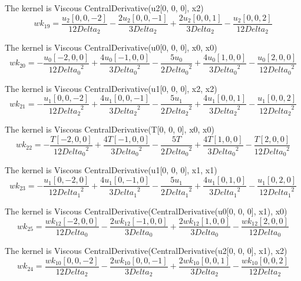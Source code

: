 \documentclass{article}
\begin{document}
The kernel is Viscous CentralDerivative(u2[0, 0, 0], x2) \begin{dmath}{wk_{19}} = \frac{{u_{2}}[{0,0,-2}]}{12 Delta_2} - 
\frac{2 {u_{2}}[{0,0,-1}]}{3 Delta_2} + \frac{2 {u_{2}}[{0,0,1}]}{3 
Delta_2} - \frac{{u_{2}}[{0,0,2}]}{12 Delta_2}\end{dmath}

The kernel is Viscous CentralDerivative(u0[0, 0, 0], x0, x0) \begin{dmath}{wk_{20}} = - \frac{{u_{0}}[{-2,0,0}]}{12 {Delta_0}^{2}} 
+ \frac{4 {u_{0}}[{-1,0,0}]}{3 {Delta_0}^{2}} - \frac{5 {u_{0}}}{2 
{Delta_0}^{2}} + \frac{4 {u_{0}}[{1,0,0}]}{3 {Delta_0}^{2}} - 
\frac{{u_{0}}[{2,0,0}]}{12 {Delta_0}^{2}}\end{dmath}

The kernel is Viscous CentralDerivative(u1[0, 0, 0], x2, x2) \begin{dmath}{wk_{21}} = - \frac{{u_{1}}[{0,0,-2}]}{12 {Delta_2}^{2}} 
+ \frac{4 {u_{1}}[{0,0,-1}]}{3 {Delta_2}^{2}} - \frac{5 {u_{1}}}{2 
{Delta_2}^{2}} + \frac{4 {u_{1}}[{0,0,1}]}{3 {Delta_2}^{2}} - 
\frac{{u_{1}}[{0,0,2}]}{12 {Delta_2}^{2}}\end{dmath}

The kernel is Viscous CentralDerivative(T[0, 0, 0], x0, x0) \begin{dmath}{wk_{22}} = - \frac{{T}[{-2,0,0}]}{12 {Delta_0}^{2}} + 
\frac{4 {T}[{-1,0,0}]}{3 {Delta_0}^{2}} - \frac{5 {T}}{2 
{Delta_0}^{2}} + \frac{4 {T}[{1,0,0}]}{3 {Delta_0}^{2}} - 
\frac{{T}[{2,0,0}]}{12 {Delta_0}^{2}}\end{dmath}

The kernel is Viscous CentralDerivative(u1[0, 0, 0], x1, x1) \begin{dmath}{wk_{23}} = - \frac{{u_{1}}[{0,-2,0}]}{12 {Delta_1}^{2}} 
+ \frac{4 {u_{1}}[{0,-1,0}]}{3 {Delta_1}^{2}} - \frac{5 {u_{1}}}{2 
{Delta_1}^{2}} + \frac{4 {u_{1}}[{0,1,0}]}{3 {Delta_1}^{2}} - 
\frac{{u_{1}}[{0,2,0}]}{12 {Delta_1}^{2}}\end{dmath}

The kernel is Viscous CentralDerivative(CentralDerivative(u0[0, 0, 0], x1), x0) \begin{dmath}{wk_{25}} = \frac{{wk_{12}}[{-2,0,0}]}{12 Delta_0} - 
\frac{2 {wk_{12}}[{-1,0,0}]}{3 Delta_0} + \frac{2 
{wk_{12}}[{1,0,0}]}{3 Delta_0} - \frac{{wk_{12}}[{2,0,0}]}{12 
Delta_0}\end{dmath}

The kernel is Viscous CentralDerivative(CentralDerivative(u2[0, 0, 0], x1), x2) \begin{dmath}{wk_{24}} = \frac{{wk_{10}}[{0,0,-2}]}{12 Delta_2} - 
\frac{2 {wk_{10}}[{0,0,-1}]}{3 Delta_2} + \frac{2 
{wk_{10}}[{0,0,1}]}{3 Delta_2} - \frac{{wk_{10}}[{0,0,2}]}{12 
Delta_2}\end{dmath}
\end{document}
